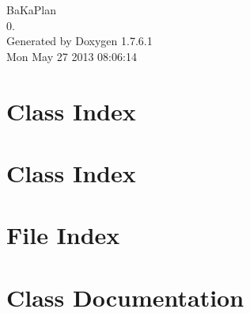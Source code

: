 \documentclass[a4paper]{book}
\begin{document}
\hypersetup{pageanchor=false,citecolor=blue}
\begin{titlepage}
\vspace*{7cm}
\begin{center}
{\Large \-Ba\-Ka\-Plan \\[1ex]\large 0. }\\
\vspace*{1cm}
{\large \-Generated by Doxygen 1.7.6.1}\\
\vspace*{0.5cm}
{\small Mon May 27 2013 08:06:14}\\
\end{center}
\end{titlepage}
\clearemptydoublepage
{}
\tableofcontents
\clearemptydoublepage
{}
\hypersetup{pageanchor=true,citecolor=blue}
\chapter{\-Class \-Index}

\chapter{\-Class \-Index}

\chapter{\-File \-Index}

\chapter{\-Class \-Documentation}
























\end{document}
